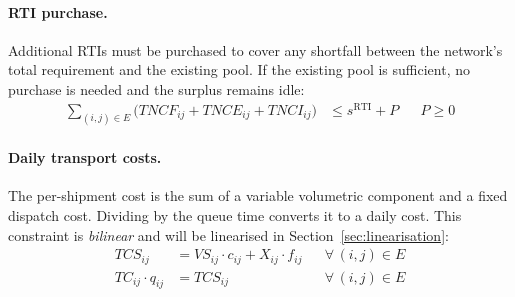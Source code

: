 \paragraph{RTI purchase.}
Additional RTIs must be purchased to cover any shortfall between the network's
total requirement and the existing pool. If the existing pool is sufficient,
no purchase is needed and the surplus remains idle:
%
\begin{align}
  \sum_{(i,j)\in E}\bigl(TNCF_{ij}+TNCE_{ij}+TNCI_{ij}\bigr)
    &\leq s^{\text{RTI}} + P
    && P \geq 0
  \label{eq:purchase}
\end{align}

\paragraph{Daily transport costs.}
The per-shipment cost is the sum of a variable volumetric component and a fixed
dispatch cost. Dividing by the queue time converts it to a daily cost. This
constraint is \emph{bilinear} and will be linearised in
Section~\ref{sec:linearisation}:
%
\begin{align}
  TCS_{ij} &= VS_{ij}\cdot c_{ij} + X_{ij}\cdot f_{ij}
    && \forall\,(i,j)\in E
    \label{eq:cost-per-ship}\\
  TC_{ij}\cdot q_{ij} &= TCS_{ij}
    && \forall\,(i,j)\in E
    \label{eq:cost-daily}
\end{align}
